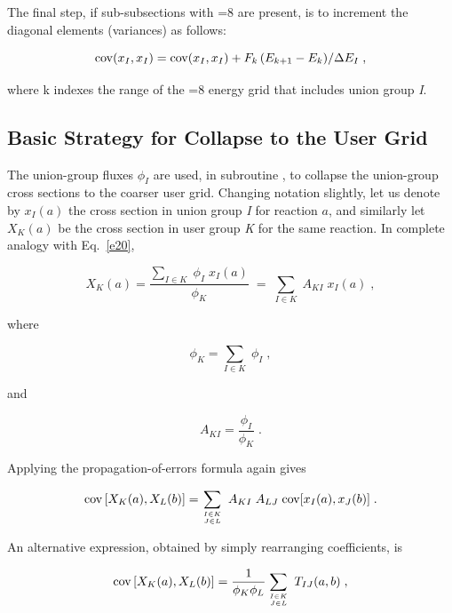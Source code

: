 The final step, if sub-subsections with =8 are present, is to
increment the diagonal elements (variances) as follows:

\begin{equation}
{\rm cov} (x_I, x_I) = {\rm cov} (x_I, x_I) +
F_k\,(E_{k+1} - E_k)/\Delta E_I \;,
\label{e35}
\end{equation}

\noindent
where k indexes the range of the =8 energy grid that includes
union group {\it I}.

\subsection{Basic Strategy for Collapse to the User Grid}
\label{ssERRORR_GridStrategy}

The union-group fluxes $\phi_I$ are used, in subroutine
, to collapse the union-group
cross sections to the coarser user grid.  Changing notation slightly,
let us denote by $x_I(a)$ the cross section in union group {\it I}
for reaction $a$, and similarly let $X_K (a)$ be the cross section
in user group {\it K} for the same reaction.  In complete analogy
with Eq.~\ref{e20},

\begin{equation}
X_K(a) = \frac {\displaystyle{\sum_{I\in K}\; \phi_I\;x_I(a)}}{\phi_K}
 \;=\; \sum_{I\in K} \; A_{KI} \; x_I(a)\;,
\end{equation}

\noindent
where

\begin{equation}
\phi_K = \sum_{I\in K} \;\phi_I \;,
\end{equation}

\noindent
and

\begin{equation}
A_{KI} = \frac{\phi_I}{\phi_K}\;.
\end{equation}

\noindent
Applying the propagation-of-errors formula again gives

\begin{equation}
{\rm cov} \left[X_K(a),X_L(b) \right] = \sum_{I\in K\atop{J\in L}}\;
  A_{KI}\;A_{LJ}\;{\rm {\rm cov}}[x_I(a),x_J(b)] \;.
\label{e39}
\end{equation}

\noindent
An alternative expression, obtained by simply rearranging coefficients, is

\begin{equation}
{\rm {\rm cov}} \left[X_K(a),X_L(b) \right] =
  \frac{1}{\phi_K \phi_L} \sum_{I\in K\atop{J\in L}} \; T_{IJ}(a,b) \; ,
\label{e40}
\end{equation}

